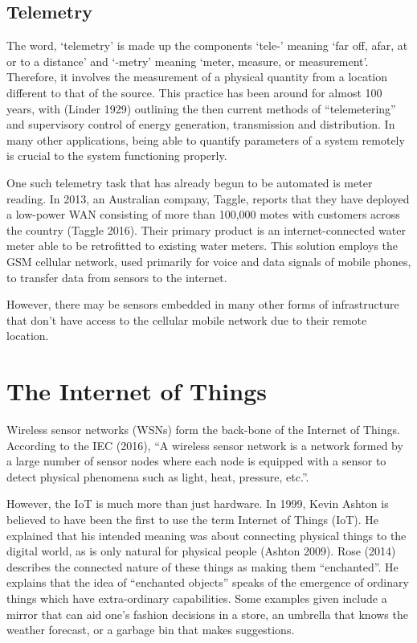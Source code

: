 \subsection{Telemetry}
The word, ‘telemetry’ is made up the components ‘tele-’ meaning ‘far off, afar, at or to a distance’ and ‘-metry’ meaning ‘meter, measure, or measurement’. Therefore, it involves the measurement of a physical quantity from a location different to that of the source. This practice has been around for almost 100 years, with (Linder 1929) outlining the then current methods of “telemetering” and supervisory control of energy generation, transmission and distribution. In many other applications, being able to quantify parameters of a system remotely is crucial to the system functioning properly.

One such telemetry task that has already begun to be automated is meter reading. In 2013, an Australian company, Taggle, reports that they have deployed a low-power WAN consisting of more than 100,000 motes with customers across the country (Taggle 2016). Their primary product is an internet-connected water meter able to be retrofitted to existing water meters. This solution employs the GSM cellular network, used primarily for voice and data signals of mobile phones, to transfer data from sensors to the internet.

However, there may be sensors embedded in many other forms of infrastructure that don’t have access to the cellular mobile network due to their remote location.


\section{The Internet of Things}

Wireless sensor networks (WSNs) form the back-bone of the Internet of Things. According to the IEC (2016), “A wireless sensor network is a network formed by a large number of sensor nodes where each node is equipped with a sensor to detect physical phenomena such as light, heat, pressure, etc.”.

However, the IoT is much more than just hardware. In 1999, Kevin Ashton is believed to have been the first to use the term Internet of Things (IoT). He explained that his intended meaning was about connecting physical things to the digital world, as is only natural for physical people (Ashton 2009). Rose (2014) describes the connected nature of these things as making them “enchanted”. He explains that the idea of “enchanted objects” speaks of the emergence of ordinary things which have extra-ordinary capabilities. Some examples given include a mirror that can aid one’s fashion decisions in a store, an umbrella that knows the weather forecast, or a garbage bin that makes suggestions.

